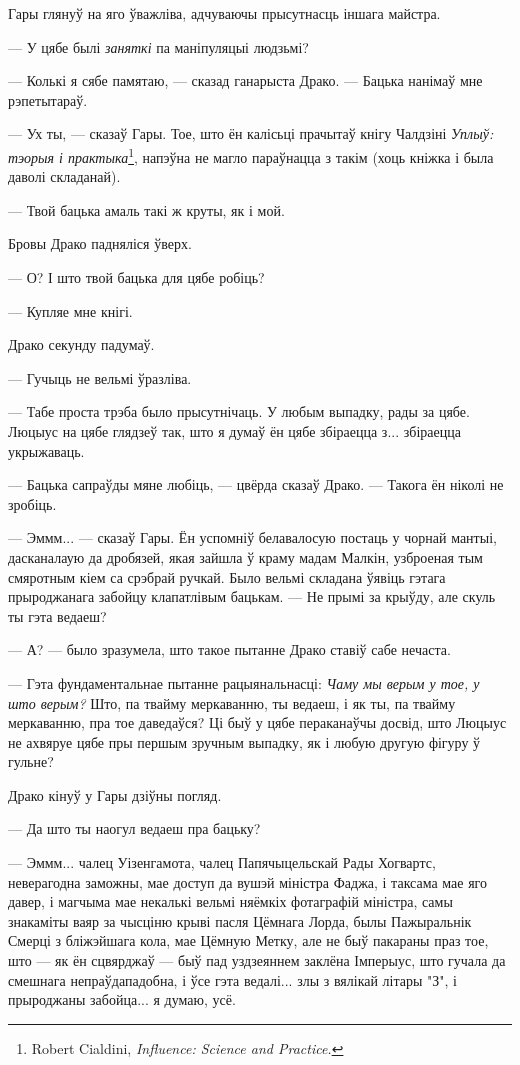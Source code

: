 Гары глянуў на яго ўважліва, адчуваючы прысутнасць іншага майстра.

--- У цябе былі \emph{заняткі} па маніпуляцыі людзьмі?

--- Колькі я сябе памятаю, --- сказад ганарыста Драко. --- Бацька
нанімаў мне рэпетытараў.

--- Ух ты, --- сказаў Гары. Тое, што ён калісьці прачытаў кнігу Чалдзіні
\emph{Уплыў: тэорыя і практыка}\footnote{{Robert Cialdini, \emph{Influence: 
Science and Practice.}}}, напэўна не магло параўнацца з такім (хоць кніжка і 
была даволі складанай).

--- Твой бацька амаль такі ж круты, як і мой.

Бровы Драко падняліся ўверх.

--- О? І што твой бацька для цябе робіць?

--- Купляе мне кнігі.

Драко секунду падумаў.

--- Гучыць не вельмі ўразліва.

--- Табе проста трэба было прысутнічаць. У любым выпадку, рады за цябе. Люцыус на
цябе глядзеў так, што я думаў ён цябе збіраецца з... збіраецца укрыжаваць.

--- Бацька сапраўды мяне любіць, --- цвёрда сказаў Драко. --- Такога ён ніколі не
зробіць.

--- Эммм... --- сказаў Гары. Ён успомніў белавалосую постаць у чорнай мантыі, 
дасканалаую да дробязей, якая зайшла ў краму мадам Малкін, узброеная тым смяротным
кіем са срэбрай ручкай. Было вельмі складана ўявіць гэтага прыроджанага 
забойцу клапатлівым бацькам. --- Не прымі за крыўду, але скуль ты гэта ведаеш?

--- А? --- было зразумела, што такое пытанне Драко ставіў сабе нечаста.

--- Гэта фундаментальнае пытанне рацыянальнасці: \emph{Чаму мы верым у тое, у што верым?}
Што, па твайму меркаванню, ты ведаеш, і як ты, па твайму меркаванню, пра тое даведаўся? 
Ці быў у цябе пераканаўчы досвід, што Люцыус не ахвяруе цябе пры
першым зручным выпадку, як і любую другую фігуру ў гульне?

Драко кінуў у Гары дзіўны погляд.

--- Да што ты наогул ведаеш пра бацьку?

--- Эммм... чалец Уізенгамота, чалец Папячыцельскай Рады Хогвартс, 
неверагодна заможны, мае доступ да вушэй міністра Фаджа, і таксама мае яго давер,
і магчыма мае некалькі вельмі няёмкіх фотаграфій міністра, самы знакаміты 
ваяр за чысціню крыві пасля Цёмнага Лорда, былы Пажыральнік Смерці з бліжэйшага
кола, мае Цёмную Метку, але не быў пакараны праз тое, што --- як ён сцвярджаў ---
быў пад уздзеяннем заклёна Імперыус, што гучала да смешнага непраўдападобна,
і ўсе гэта ведалі... злы з вялікай літары "З", і прыроджаны забойца... я думаю,
усё.

